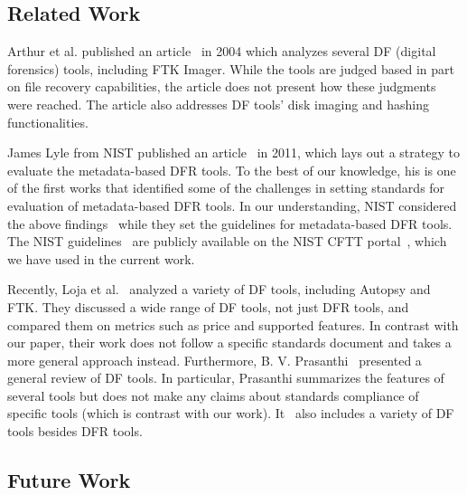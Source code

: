 \subsection{Related Work}

\begin{paraphrase}
 Arthur et al. published an article~\cite{arthur2004} in 2004 which analyzes several DF (digital forensics) tools, including FTK Imager.
While the tools are judged based in part on file recovery capabilities, the article does not present how these judgments were reached.
The article also addresses DF tools' disk imaging and hashing functionalities.

James Lyle from NIST published an article~\cite{lyle2011-ICDF2C} in 2011, which lays out a strategy to evaluate the metadata-based DFR tools. To the best of our knowledge, 
his is one of the first works that identified some of the challenges in setting standards for evaluation of metadata-based DFR tools.
In our understanding, NIST considered the above findings~\cite{lyle2011-ICDF2C} while they set the guidelines for metadata-based DFR tools.  
The NIST guidelines~\cite{meta:dfr:standards} are publicly available on the NIST CFTT portal~\cite{cftt:nist}, which we have used in the current work.

Recently, Loja et al.~\cite{loja2016} analyzed a variety of DF tools, including Autopsy and FTK. 
They discussed a wide range of DF tools, not just DFR tools, and compared them on metrics such as price and supported features. 
In contrast with our paper, their work does not follow a specific standards document and takes a more general approach instead.
Furthermore, B. V. Prasanthi~\cite{prasanthi2016} presented a general review of DF tools. 
In particular, Prasanthi summarizes the features of several tools but does not make any claims about standards compliance of specific tools (which is contrast with our work).
It~\cite{prasanthi2016} also includes a variety of DF tools besides DFR tools.
\end{paraphrase}


\subsection{Future Work}

